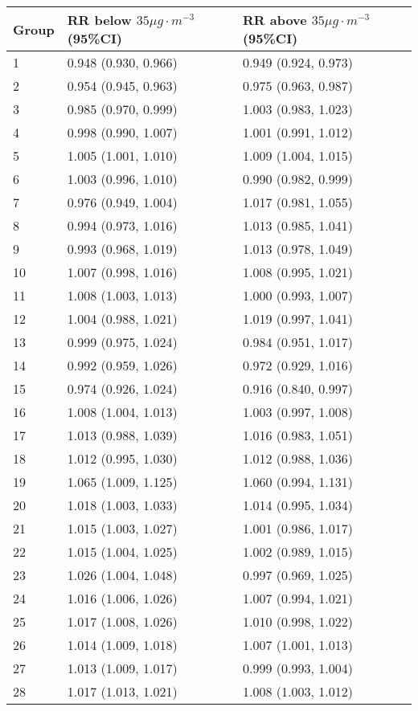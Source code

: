 \begin{tabular}{lll}
  \hline
Group & RR below $35 \mu g \cdot m^{-3}$ (95\%CI) & RR above $35 \mu g \cdot m^{-3}$ (95\%CI) \\ 
  \hline
   1 & 0.948 (0.930, 0.966) & 0.949 (0.924, 0.973) \\ 
     2 & 0.954 (0.945, 0.963) & 0.975 (0.963, 0.987) \\ 
     3 & 0.985 (0.970, 0.999) & 1.003 (0.983, 1.023) \\ 
     4 & 0.998 (0.990, 1.007) & 1.001 (0.991, 1.012) \\ 
     5 & 1.005 (1.001, 1.010) & 1.009 (1.004, 1.015) \\ 
     6 & 1.003 (0.996, 1.010) & 0.990 (0.982, 0.999) \\ 
     7 & 0.976 (0.949, 1.004) & 1.017 (0.981, 1.055) \\ 
     8 & 0.994 (0.973, 1.016) & 1.013 (0.985, 1.041) \\ 
     9 & 0.993 (0.968, 1.019) & 1.013 (0.978, 1.049) \\ 
    10 & 1.007 (0.998, 1.016) & 1.008 (0.995, 1.021) \\ 
    11 & 1.008 (1.003, 1.013) & 1.000 (0.993, 1.007) \\ 
    12 & 1.004 (0.988, 1.021) & 1.019 (0.997, 1.041) \\ 
    13 & 0.999 (0.975, 1.024) & 0.984 (0.951, 1.017) \\ 
    14 & 0.992 (0.959, 1.026) & 0.972 (0.929, 1.016) \\ 
    15 & 0.974 (0.926, 1.024) & 0.916 (0.840, 0.997) \\ 
    16 & 1.008 (1.004, 1.013) & 1.003 (0.997, 1.008) \\ 
    17 & 1.013 (0.988, 1.039) & 1.016 (0.983, 1.051) \\ 
    18 & 1.012 (0.995, 1.030) & 1.012 (0.988, 1.036) \\ 
    19 & 1.065 (1.009, 1.125) & 1.060 (0.994, 1.131) \\ 
    20 & 1.018 (1.003, 1.033) & 1.014 (0.995, 1.034) \\ 
    21 & 1.015 (1.003, 1.027) & 1.001 (0.986, 1.017) \\ 
    22 & 1.015 (1.004, 1.025) & 1.002 (0.989, 1.015) \\ 
    23 & 1.026 (1.004, 1.048) & 0.997 (0.969, 1.025) \\ 
    24 & 1.016 (1.006, 1.026) & 1.007 (0.994, 1.021) \\ 
    25 & 1.017 (1.008, 1.026) & 1.010 (0.998, 1.022) \\ 
    26 & 1.014 (1.009, 1.018) & 1.007 (1.001, 1.013) \\ 
    27 & 1.013 (1.009, 1.017) & 0.999 (0.993, 1.004) \\ 
    28 & 1.017 (1.013, 1.021) & 1.008 (1.003, 1.012) \\ 
   \hline
\end{tabular}

